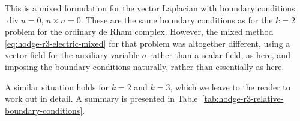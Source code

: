 {This is a mixed formulation for the vector Laplacian with boundary conditions $\operatorname{div}u=0$, $u\times n=0$. These are the same boundary conditions as for the $k=2$ problem for the ordinary de Rham complex. However, the mixed method \eqref{eq:hodge-r3-electric-mixed} for that problem was altogether different, using a vector field for the auxiliary variable $\sigma$ rather than a scalar field, as here, and imposing the boundary conditions naturally, rather than essentially as here.}

{A similar situation holds for $k=2$ and $k=3$, which we leave to the reader to work out in detail. A summary is presented in Table~\ref{tab:hodge-r3-relative-boundary-conditions}.}

